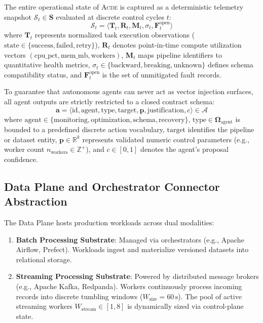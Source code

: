 The entire operational state of \textsc{Acde} is captured as a deterministic telemetry snapshot $\mathcal{S}_t \in \mathbf{S}$ evaluated at discrete control cycles $t$:
\begin{equation}
\mathcal{S}_t = \big\langle \mathbf{T}_t, \mathbf{R}_t, \mathbf{M}_t, \sigma_t, \mathbf{F}_t^{\text{open}} \big\rangle
\end{equation}
where $\mathbf{T}_t$ represents normalized task execution observations ($\text{state} \in \{\text{success}, \text{failed}, \text{retry}\}$), $\mathbf{R}_t$ denotes point-in-time compute utilization vectors $(\text{cpu\_pct}, \text{mem\_mb}, \text{workers})$, $\mathbf{M}_t$ maps pipeline identifiers to quantitative health metrics, $\sigma_t \in \{\text{backward}, \text{breaking}, \text{unknown}\}$ defines schema compatibility status, and $\mathbf{F}_t^{\text{open}}$ is the set of unmitigated fault records.

To guarantee that autonomous agents can never act as vector injection surfaces, all agent outputs are strictly restricted to a closed contract schema:
\begin{equation}
\mathbf{a} = \big\langle \text{id}, \text{agent}, \text{type}, \text{target}, \mathbf{p}, \text{justification}, c \big\rangle \in \mathcal{A}
\end{equation}
where $\text{agent} \in \{\text{monitoring}, \text{optimization}, \text{schema}, \text{recovery}\}$, $\text{type} \in \mathbf{\Omega}_{\text{agent}}$ is bounded to a predefined discrete action vocabulary, $\text{target}$ identifies the pipeline or dataset entity, $\mathbf{p} \in \mathbb{R}^k$ represents validated numeric control parameters (e.g., worker count $n_{\text{workers}} \in \mathbb{Z}^+$), and $c \in [0, 1]$ denotes the agent's proposal confidence.

\subsection{Data Plane and Orchestrator Connector Abstraction}
\label{subsec:dataplane}

The Data Plane hosts production workloads across dual modalities:
\begin{enumerate}
    \item \textbf{Batch Processing Substrate}: Managed via orchestrators (e.g., Apache Airflow, Prefect). Workloads ingest and materialize versioned datasets into relational storage.
    \item \textbf{Streaming Processing Substrate}: Powered by distributed message brokers (e.g., Apache Kafka, Redpanda). Workers continuously process incoming records into discrete tumbling windows ($W_{\text{size}} = 60\,\text{s}$). The pool of active streaming workers $W_{\text{stream}} \in [1, 8]$ is dynamically sized via control-plane state.
\end{enumerate}

